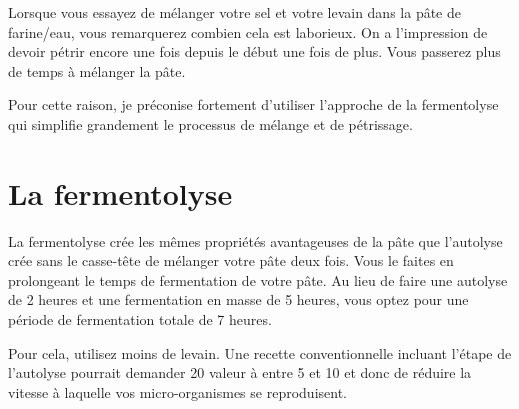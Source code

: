Lorsque vous essayez de mélanger votre sel et votre levain dans la pâte de farine/eau, vous remarquerez
combien cela est laborieux. On a l'impression de devoir pétrir encore une fois depuis le début
une fois de plus. Vous passerez plus de temps à mélanger la pâte.

Pour cette raison, je préconise fortement d'utiliser l'approche de la fermentolyse
qui simplifie grandement le processus de mélange et de pétrissage.

\section{La fermentolyse}
\label{section:fermentolysis}

La fermentolyse crée les mêmes propriétés avantageuses de la pâte que 
l'autolyse crée sans le casse-tête de mélanger votre pâte deux fois. Vous le faites
en prolongeant le temps de fermentation de votre pâte. Au lieu de faire une autolyse de 2 heures
et une fermentation en masse de 5 heures, vous optez pour une période de fermentation totale de 7 heures.

Pour cela, utilisez moins de levain. Une recette conventionnelle incluant l'étape de l'autolyse pourrait demander 20%
valeur à entre 5 et 10%
et donc de réduire la vitesse à laquelle vos micro-organismes se reproduisent.

